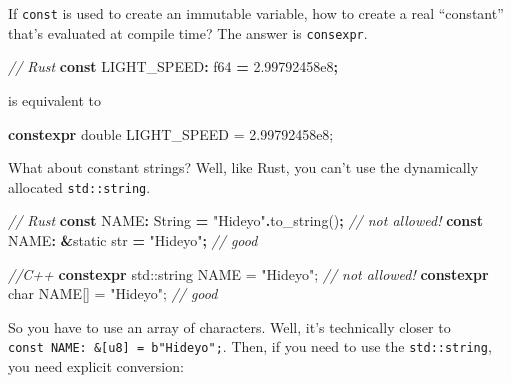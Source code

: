 \documentclass[
]{book}
\newenvironment{Shaded}{\begin{snugshade}}{\end{snugshade}}
\newcommand{\BuiltInTok}[1]{#1}
\newcommand{\CommentTok}[1]{\textcolor[rgb]{0.56,0.35,0.01}{\textit{#1}}}
\newcommand{\DataTypeTok}[1]{\textcolor[rgb]{0.13,0.29,0.53}{#1}}
\newcommand{\DecValTok}[1]{\textcolor[rgb]{0.00,0.00,0.81}{#1}}
\newcommand{\FloatTok}[1]{\textcolor[rgb]{0.00,0.00,0.81}{#1}}
\newcommand{\KeywordTok}[1]{\textcolor[rgb]{0.13,0.29,0.53}{\textbf{#1}}}
\newcommand{\NormalTok}[1]{#1}
\newcommand{\OperatorTok}[1]{\textcolor[rgb]{0.81,0.36,0.00}{\textbf{#1}}}
\newcommand{\OtherTok}[1]{\textcolor[rgb]{0.56,0.35,0.01}{#1}}
\newcommand{\StringTok}[1]{\textcolor[rgb]{0.31,0.60,0.02}{#1}}
\begin{document}
If \texttt{const} is used to create an immutable variable, how to create a real ``constant'' that's evaluated at compile time? The answer is \texttt{consexpr}.

\begin{Shaded}
\begin{Highlighting}[]
\CommentTok{// Rust}
\KeywordTok{const}\NormalTok{ LIGHT\_SPEED}\OperatorTok{:} \DataTypeTok{f64} \OperatorTok{=} \DecValTok{2.99792458e8}\OperatorTok{;}
\end{Highlighting}
\end{Shaded}

is equivalent to

\begin{Shaded}
\begin{Highlighting}[]
\KeywordTok{constexpr} \DataTypeTok{double}\NormalTok{ LIGHT\_SPEED = }\FloatTok{2.99792458e8}\NormalTok{;}
\end{Highlighting}
\end{Shaded}

What about constant strings? Well, like Rust, you can't use the dynamically allocated \texttt{std::string}.

\begin{Shaded}
\begin{Highlighting}[]
\CommentTok{// Rust}
\KeywordTok{const}\NormalTok{ NAME}\OperatorTok{:} \DataTypeTok{String} \OperatorTok{=} \StringTok{"Hideyo"}\OperatorTok{.}\NormalTok{to\_string()}\OperatorTok{;} \CommentTok{// not allowed!}
\KeywordTok{const}\NormalTok{ NAME}\OperatorTok{:} \OperatorTok{\&}\OtherTok{\textquotesingle{}static} \DataTypeTok{str} \OperatorTok{=} \StringTok{"Hideyo"}\OperatorTok{;}       \CommentTok{// good}
\end{Highlighting}
\end{Shaded}

\begin{Shaded}
\begin{Highlighting}[]
\CommentTok{//C++}
\KeywordTok{constexpr} \BuiltInTok{std::}\NormalTok{string NAME = }\StringTok{"Hideyo"}\NormalTok{; }\CommentTok{// not allowed!}
\KeywordTok{constexpr} \DataTypeTok{char}\NormalTok{ NAME[] = }\StringTok{"Hideyo"}\NormalTok{;      }\CommentTok{// good}
\end{Highlighting}
\end{Shaded}

So you have to use an array of characters. Well, it's technically closer to \texttt{const\ NAME:\ \&{[}u8{]}\ =\ b"Hideyo";}. Then, if you need to use the \texttt{std::string}, you need explicit conversion:
\end{document}
